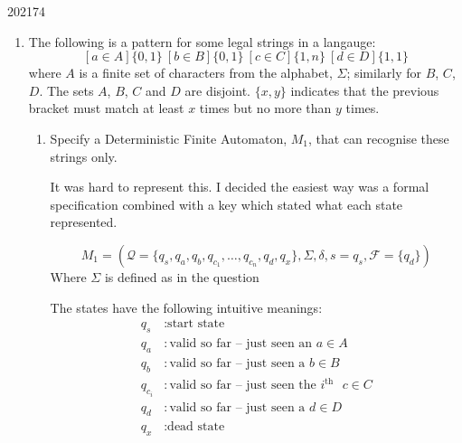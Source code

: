 \documentclass[10pt,\jkfside,a4paper]{article}
\begin{document}
\begin{examquestion}{2021}{7}{4}

\begin{enumerate}[label=(\alph*)]

\item The following is a pattern for some legal strings in a langauge:
\[
[a \in A]\{0, 1\}\
[b \in B]\{0, 1\}\
[c \in C]\{1, n\}\
[d \in D]\{1, 1\}
\]
where $A$ is a finite set of characters from the alphabet, $\Sigma$;
similarly for $B$, $C$, $D$. The sets $A$, $B$, $C$ and $D$ are disjoint.
$\{x, y\}$ indicates that the previous bracket must match at least $x$ times
but no more than $y$ times.

\begin{enumerate}[label=(\roman*)]

\item Specify a Deterministic Finite Automaton, $M_1$, that can recognise
these strings only.

It was hard to represent this. I decided the easiest way was a formal
specification combined with a key which stated what each state represented.

\[
M_1 = \left(
\mathcal Q = \{q_s, q_a, q_b, q_{c_1}, \dots, q_{c_n}, q_d, q_x\},
\Sigma,
\delta,
s = q_s,
\mathcal F = \{q_d\}
\right)
\]
Where $\Sigma$ is defined as in the question

The states have the following intuitive meanings:
\begin{align*}
q_s &: \text{start state} \\
q_a &: \text{valid so far -- just seen an } a \in A \\
q_b &: \text{valid so far -- just seen a } b \in B \\
q_{c_i} &: \text{valid so far -- just seen the $i^{\text{th}}$ } c \in C \\
q_d &: \text{valid so far -- just seen a } d \in D \\
q_x &: \text{dead state}
\end{align*}


\end{enumerate}
\end{enumerate}
\end{examquestion}
\end{document}

